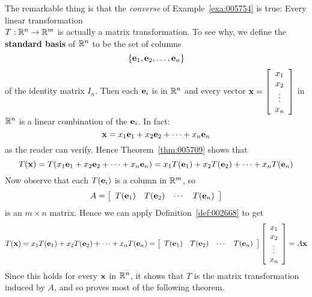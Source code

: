 The remarkable thing is that the \textit{converse} of Example~\ref{exa:005754} is true: Every linear transformation \\ $T : \mathbb{R}^n \to \mathbb{R}^m$ is actually a matrix transformation. To see why, we define the \textbf{standard basis} of $\mathbb{R}^n$ to be the set of columns
\begin{equation*}
\{\textbf{e}_{1}, \textbf{e}_{2}, \dots, \textbf{e}_{n}\}
\end{equation*}
of the identity matrix $I_{n}$. Then each $\textbf{e}_{i}$ is in $\mathbb{R}^n$ and every vector $\textbf{x} = \left[ \begin{array}{c}
x_{1} \\
x_{2} \\
\vdots \\
x_{n}
\end{array} \right]$
 in $\mathbb{R}^n$ is a linear combination of the $\textbf{e}_{i}$. In fact:
\begin{equation*}
\textbf{x} = x_{1}\textbf{e}_{1} + x_{2}\textbf{e}_{2} + \cdots + x_{n}\textbf{e}_{n}
\end{equation*}
as the reader can verify. Hence Theorem~\ref{thm:005709} shows that
\begin{equation*}
T(\textbf{x}) = T(x_{1}\textbf{e}_{1} + x_{2}\textbf{e}_{2} + \cdots + x_{n}\textbf{e}_{n}) = x_{1}T(\textbf{e}_{1}) + x_{2}T(\textbf{e}_{2}) + \cdots + x_{n}T(\textbf{e}_{n})
\end{equation*}
Now observe that each $T(\textbf{e}_{i})$ is a column in $\mathbb{R}^m$, so
\begin{equation*}
A = \left[ \begin{array}{cccc}
T(\textbf{e}_{1}) & T(\textbf{e}_{2}) & \cdots & T(\textbf{e}_{n})
\end{array} \right]
\end{equation*}
is an $m \times n$ matrix. Hence we can apply Definition~\ref{def:002668} to get
\begin{equation*}
T(\textbf{x}) = x_{1}T(\textbf{e}_{1}) + x_{2}T(\textbf{e}_{2}) + \cdots + x_{n}T(\textbf{e}_{n}) = \left[ \begin{array}{cccc}
T(\textbf{e}_{1}) & T(\textbf{e}_{2}) & \cdots & T(\textbf{e}_{n})
\end{array} \right] \left[ \begin{array}{c}
x_{1} \\
x_{2} \\
\vdots \\
x_{n}
\end{array} \right] = A\textbf{x}
\end{equation*}
Since this holds for every $\textbf{x}$ in $\mathbb{R}^n$, it shows that $T$ is the matrix transformation induced by $A$, and so proves most of the following theorem.

